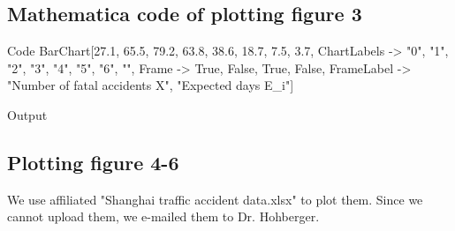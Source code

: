 \documentclass[a4paper,12pt]{article}
\begin{document}
\subsection{Mathematica code of plotting figure 3}
\begin{mmaCell}[functionlocal=E]{Code}
  BarChart[{27.1, 65.5, 79.2, 63.8, 38.6, 18.7, 7.5, 3.7}, 
   ChartLabels -> {"0", "1", "2", "3", "4", "5", "6", ""},
   Frame -> {{True, False}, {True, False}}, 
   FrameLabel -> {"Number of fatal accidents X", 
   "Expected days E_i"}]
\end{mmaCell}
 \begin{mmaCell}[moregraphics={moreig={scale=.7}}]{Output}
 \end{mmaCell}


\subsection{Plotting figure 4-6}
\noindent We use affiliated "Shanghai traffic accident data.xlsx" to plot them. Since we cannot upload them, we e-mailed them to Dr. Hohberger.
\end{document}
